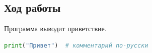 \subsection*{Ход работы}
Программа выводит приветствие.
\begin{lstlisting}[language=Python]
print("Привет")  # комментарий по-русски
\end{lstlisting}
